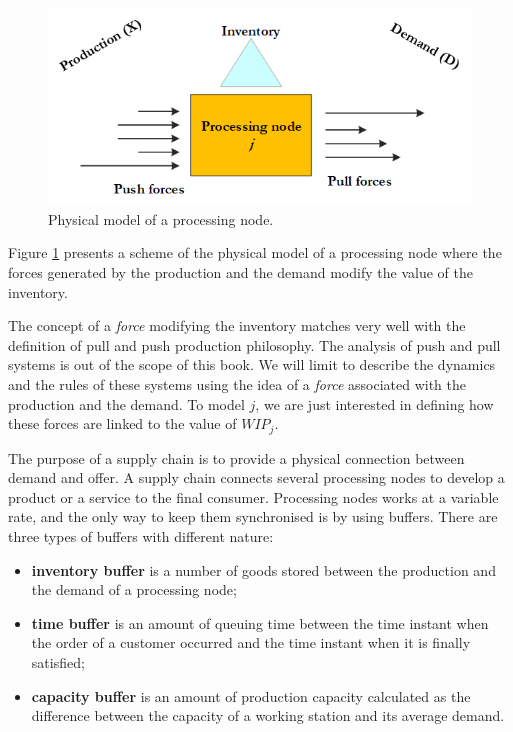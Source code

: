 \begin{figure}[hbt!]
\centering
\includegraphics[width=1\textwidth]{SectionIntroduction/informationFramework_figures/fig_processingNode.png}
\captionsetup{type=figure}
\caption{Physical model of a processing node.}
\label{fig_processingNode}
\end{figure}

Figure \ref{fig_processingNode} presents a scheme of the physical model of a processing node where the forces generated by the production and the demand modify the value of the inventory.\par

The concept of a \textit{force} modifying the inventory matches very well with the definition of pull and push production philosophy. The analysis of push and pull systems is out of the scope of this book. We will limit to describe the dynamics and the rules of these systems using the idea of a \textit{force} associated with the production and the demand. To model $j$, we are just interested in defining how these forces are linked to the value of $WIP_j$. \par

The purpose of a supply chain is to provide a physical connection between demand and offer. A supply chain connects several processing nodes to develop a product or a service to the final consumer. Processing nodes works at a variable rate, and the only way to keep them synchronised is by using buffers. There are three types of buffers with different nature:
\begin{itemize}
    \item \textbf{inventory buffer} is a number of goods stored between the production and the demand of a processing node;
    \item \textbf{time buffer} is an amount of queuing time between the time instant when the order of a customer occurred and the time instant when it is finally satisfied;
    \item \textbf{capacity buffer} is an amount of production capacity calculated as the difference between the capacity of a working station and its average demand.
\end{itemize}


